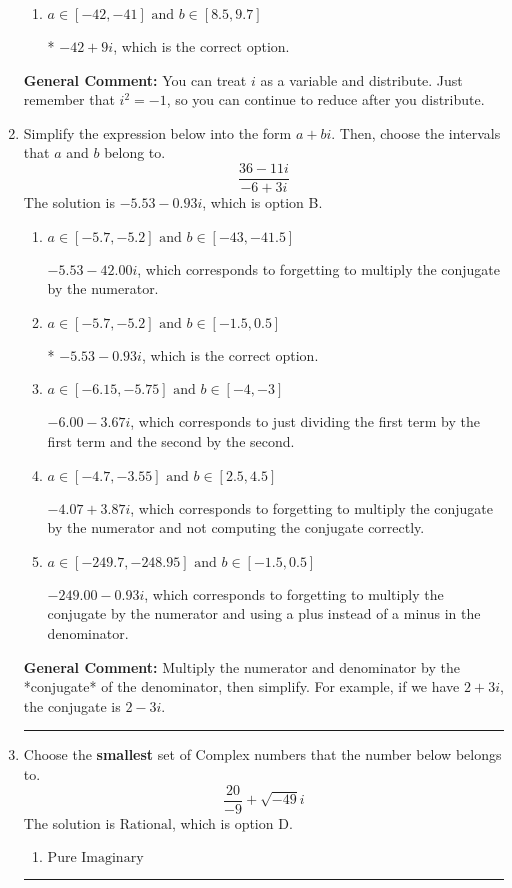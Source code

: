 \documentclass{extbook}[14pt]
\newcommand{\litem}[1]{\item #1

\rule{\textwidth}{0.4pt}}
\begin{document}
\begin{enumerate}
{\begin{enumerate}[label=\Alph*.]
 $-18 - 39 i$, which corresponds to adding a minus sign in the first term.
\item \( a \in [-42, -41] \text{ and } b \in [8.5, 9.7] \)

* $-42 + 9 i$, which is the correct option.
\end{enumerate}

\textbf{General Comment:} You can treat $i$ as a variable and distribute. Just remember that $i^2=-1$, so you can continue to reduce after you distribute.
}
\litem{
Simplify the expression below into the form $a+bi$. Then, choose the intervals that $a$ and $b$ belong to.
\[ \frac{36 - 11 i}{-6 + 3 i} \]The solution is \( -5.53  - 0.93 i \), which is option B.\begin{enumerate}[label=\Alph*.]
\item \( a \in [-5.7, -5.2] \text{ and } b \in [-43, -41.5] \)

 $-5.53  - 42.00 i$, which corresponds to forgetting to multiply the conjugate by the numerator.
\item \( a \in [-5.7, -5.2] \text{ and } b \in [-1.5, 0.5] \)

* $-5.53  - 0.93 i$, which is the correct option.
\item \( a \in [-6.15, -5.75] \text{ and } b \in [-4, -3] \)

 $-6.00  - 3.67 i$, which corresponds to just dividing the first term by the first term and the second by the second.
\item \( a \in [-4.7, -3.55] \text{ and } b \in [2.5, 4.5] \)

 $-4.07  + 3.87 i$, which corresponds to forgetting to multiply the conjugate by the numerator and not computing the conjugate correctly.
\item \( a \in [-249.7, -248.95] \text{ and } b \in [-1.5, 0.5] \)

 $-249.00  - 0.93 i$, which corresponds to forgetting to multiply the conjugate by the numerator and using a plus instead of a minus in the denominator.
\end{enumerate}

\textbf{General Comment:} Multiply the numerator and denominator by the *conjugate* of the denominator, then simplify. For example, if we have $2+3i$, the conjugate is $2-3i$.
}
\litem{
Choose the \textbf{smallest} set of Complex numbers that the number below belongs to.
\[ \frac{20}{-9}+\sqrt{-49}i \]The solution is \( \text{Rational} \), which is option D.\begin{enumerate}[label=\Alph*.]
\item \( \text{Pure Imaginary} \)


\end{enumerate}}
\end{enumerate}
\end{document}
